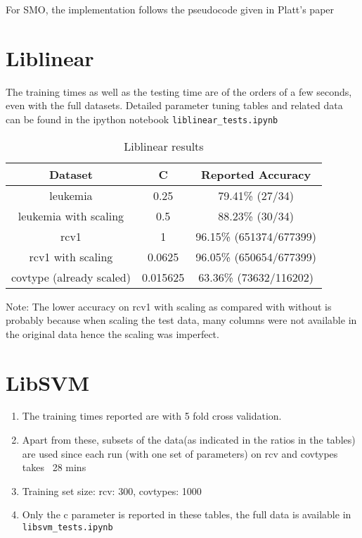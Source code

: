 \documentclass{article}
\begin{document}
For SMO, the implementation follows the pseudocode given in Platt's paper


\section{Liblinear}
The training times as well as the testing time are of the orders of a few seconds, even with the full datasets.
Detailed parameter tuning tables and related data can be found in the ipython notebook \verb|liblinear_tests.ipynb|
\begin{table}
    \begin{tabular}{|c|c|c|}
    \hline
    \textbf{Dataset}                  & \textbf{C}        & \textbf{Reported Accuracy}       \\ \hline
    leukemia                 & 0.25     & 79.41\% (27/34)         \\ \hline
    leukemia with scaling    & 0.5      & 88.23\% (30/34)         \\ \hline
    rcv1                     & 1        & 96.15\% (651374/677399) \\ \hline
    rcv1 with scaling        & 0.0625   & 96.05\% (650654/677399) \\ \hline
    covtype (already scaled) & 0.015625 & 63.36\% (73632/116202)  \\ \hline
    \end{tabular}
    \caption{Liblinear results}
\end{table}

Note: The lower accuracy on rcv1 with scaling as compared with without is probably because when scaling the test data, many columns were not available in the original data hence the scaling was imperfect.

\section{LibSVM}

\begin{enumerate}
\item The training times reported are with 5 fold cross validation.
\item Apart from these, subsets of the data(as indicated in the ratios in the tables) are used since each run (with one set of parameters) on rcv and covtypes takes ~28 mins
\item Training set size: rcv: 300, covtypes: 1000
\item Only the c parameter is reported in these tables, the full data is available in \verb|libsvm_tests.ipynb|
\end{enumerate}
\end{document}
